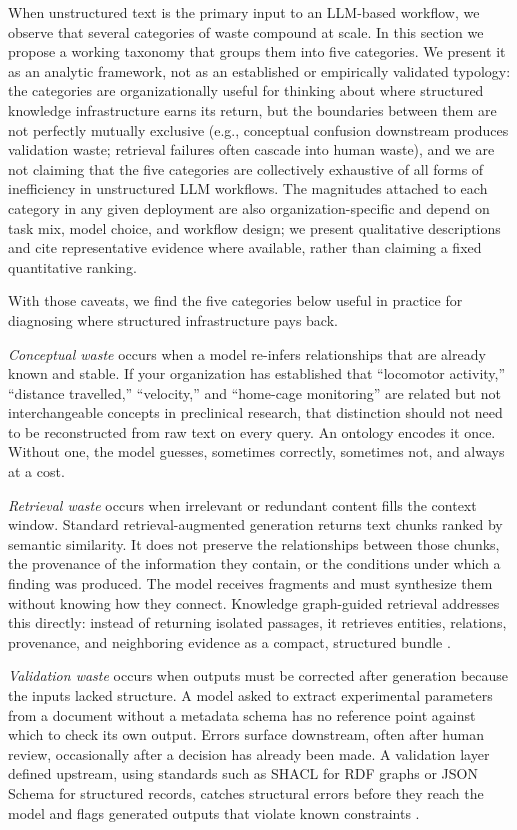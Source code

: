 \documentclass[man,12pt,donotrepeattitle]{apa7}
\begin{document}
When unstructured text is the primary input to an LLM-based workflow, we
observe that several categories of waste compound at scale. In this section
we propose a working taxonomy that groups them into five categories. We
present it as an analytic framework, not as an established or empirically
validated typology: the categories are organizationally useful for thinking
about where structured knowledge infrastructure earns its return, but the
boundaries between them are not perfectly mutually exclusive (e.g.,
conceptual confusion downstream produces validation waste; retrieval
failures often cascade into human waste), and we are not claiming that the
five categories are collectively exhaustive of all forms of inefficiency in
unstructured LLM workflows. The magnitudes attached to each category in any
given deployment are also organization-specific and depend on task mix,
model choice, and workflow design; we present qualitative descriptions and
cite representative evidence where available, rather than claiming a fixed
quantitative ranking.

With those caveats, we find the five categories below useful in practice
for diagnosing where structured infrastructure pays back.

\textit{Conceptual waste} occurs when a model re-infers relationships that
are already known and stable. If your organization has established that
``locomotor activity,'' ``distance travelled,'' ``velocity,'' and
``home-cage monitoring'' are related but not interchangeable concepts in
preclinical research, that distinction should not need to be reconstructed
from raw text on every query. An ontology encodes it once. Without one,
the model guesses, sometimes correctly, sometimes not, and always at a cost.

\textit{Retrieval waste} occurs when irrelevant or redundant content fills
the context window. Standard retrieval-augmented generation returns text
chunks ranked by semantic similarity. It does not preserve the relationships
between those chunks, the provenance of the information they contain, or the
conditions under which a finding was produced. The model receives fragments
and must synthesize them without knowing how they connect. Knowledge
graph-guided retrieval addresses this directly: instead of returning
isolated passages, it retrieves entities, relations, provenance, and
neighboring evidence as a compact, structured bundle
\parencite{zhu2025,peng2025}.

\textit{Validation waste} occurs when outputs must be corrected after
generation because the inputs lacked structure. A model asked to extract
experimental parameters from a document without a metadata schema has no
reference point against which to check its own output. Errors surface
downstream, often after human review, occasionally after a decision has
already been made. A validation layer defined upstream, using standards
such as SHACL for RDF graphs or JSON Schema for structured records, catches
structural errors before they reach the model and flags generated outputs
that violate known constraints \parencite{wilkinson2016}.
\end{document}
